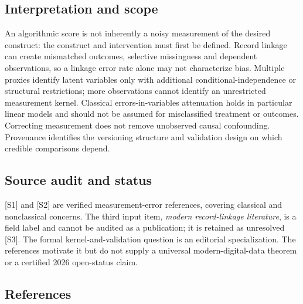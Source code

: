 \documentclass[11pt,a4paper]{article}
\begin{document}
\subsection*{Interpretation and scope}

An algorithmic score is not inherently a noisy measurement of the desired construct: the construct and intervention must first be defined. Record linkage can create mismatched outcomes, selective missingness and dependent observations, so a linkage error rate alone may not characterize bias. Multiple proxies identify latent variables only with additional conditional-independence or structural restrictions; more observations cannot identify an unrestricted measurement kernel. Classical errors-in-variables attenuation holds in particular linear models and should not be assumed for misclassified treatment or outcomes. Correcting measurement does not remove unobserved causal confounding. Provenance identifies the versioning structure and validation design on which credible comparisons depend.

\subsection*{Source audit and status}

[S1] and [S2] are verified measurement-error references, covering classical and nonclassical concerns. The third input item, \emph{modern record-linkage literature}, is a field label and cannot be audited as a publication; it is retained as unresolved [S3]. The formal kernel-and-validation question is an editorial specialization. The references motivate it but do not supply a universal modern-digital-data theorem or a certified 2026 open-status claim.

\subsection*{References}
\end{document}
